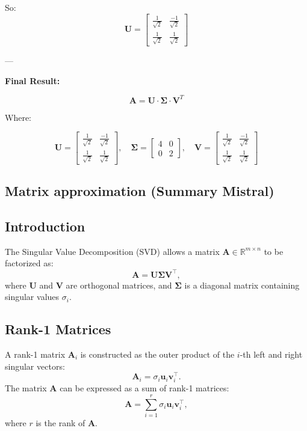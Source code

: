 So:
\[
\textbf{U} =
\begin{bmatrix}
\frac{1}{\sqrt{2}} & \frac{-1}{\sqrt{2}} \\
\frac{1}{\sqrt{2}} & \frac{1}{\sqrt{2}}
\end{bmatrix}
\]

---

\textbf{Final Result:}

\[
\textbf{A} = \textbf{U} \cdot \boldsymbol{\Sigma} \cdot \textbf{V}^T
\]

Where:

\[
\textbf{U} =
\begin{bmatrix}
\frac{1}{\sqrt{2}} & \frac{-1}{\sqrt{2}} \\
\frac{1}{\sqrt{2}} & \frac{1}{\sqrt{2}}
\end{bmatrix}, \quad
\boldsymbol{\Sigma} =
\begin{bmatrix}
4 & 0 \\
0 & 2
\end{bmatrix}, \quad
\textbf{V} =
\begin{bmatrix}
\frac{1}{\sqrt{2}} & \frac{-1}{\sqrt{2}} \\
\frac{1}{\sqrt{2}} & \frac{1}{\sqrt{2}}
\end{bmatrix}
\]


\subsection{Matrix approximation (Summary Mistral)}

\subsection{Introduction}
The Singular Value Decomposition (SVD) allows a matrix \(\boldsymbol{A} \in \mathbb{R}^{m \times n}\) to be factorized as:
\[
\boldsymbol{A} = \boldsymbol{U} \boldsymbol{\Sigma} \boldsymbol{V}^\top,
\]
where \(\boldsymbol{U}\) and \(\boldsymbol{V}\) are orthogonal matrices, and \(\boldsymbol{\Sigma}\) is a diagonal matrix containing singular values \(\sigma_i\).

\subsection{Rank-1 Matrices}
A rank-1 matrix \(\boldsymbol{A}_i\) is constructed as the outer product of the \(i\)-th left and right singular vectors:
\[
\boldsymbol{A}_i = \sigma_i \boldsymbol{u}_i \boldsymbol{v}_i^\top.
\]
The matrix \(\boldsymbol{A}\) can be expressed as a sum of rank-1 matrices:
\[
\boldsymbol{A} = \sum_{i=1}^r \sigma_i \boldsymbol{u}_i \boldsymbol{v}_i^\top,
\]
where \(r\) is the rank of \(\boldsymbol{A}\).

